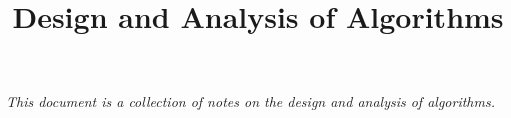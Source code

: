 \documentclass{report}
\title{\huge{Design and Analysis of Algorithms}}
\date{}
\begin{document}
\maketitle
\pagestyle{fancy}
\fancyhf{}

\begin{center}
	\emph{This document is a collection of notes on the design and analysis of algorithms.}
\end{center}

\tableofcontents
{}
\pagestyle{headings}



\pagebreak
\end{document}
